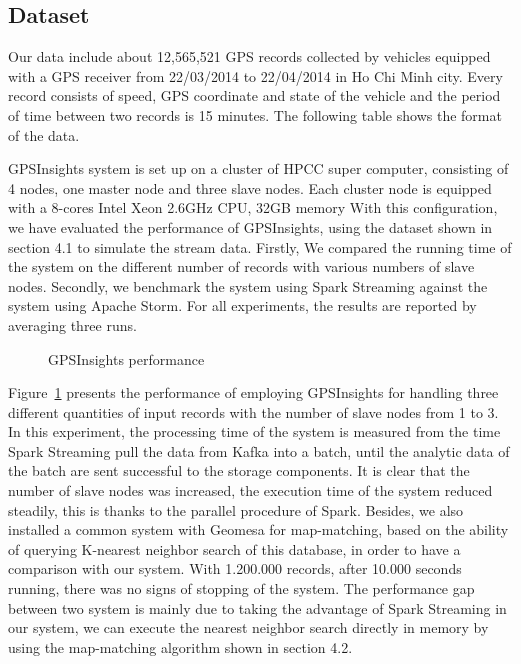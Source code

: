 \documentclass{acm_proc_article-sp}
\begin{document}
\subsection{Dataset}

Our data include about 12,565,521 GPS records collected by vehicles equipped with a GPS receiver from 22/03/2014 to 22/04/2014 in Ho Chi Minh city. Every record consists of speed, GPS coordinate and state of the vehicle and the period of time between two records is 15 minutes. The following table shows the format of the data.

	GPSInsights system is set up on a cluster of HPCC super computer, consisting of 4 nodes, one master node and three slave nodes. Each cluster node is equipped with a  8-cores Intel Xeon 2.6GHz CPU, 32GB memory 
	With this configuration, we have evaluated the performance of GPSInsights, using the dataset shown in section 4.1 to simulate the stream data. Firstly, We compared the running time of the system on the different number of records with various numbers of slave nodes. Secondly, we benchmark the system using Spark Streaming against the system using Apache Storm. For all experiments, the results are reported by averaging three runs. 
	
	
	\begin{figure}[h]
		\centering
		\caption{GPSInsights performance}
		\label{fig:performance}
	\end{figure}

Figure~\ref{fig:performance} presents the performance of employing GPSInsights for handling three different quantities of input records with the number of slave nodes from 1 to 3. In this experiment, the processing time of the system is measured from the time Spark Streaming pull the data from Kafka into a batch, until the analytic data of the batch are sent successful to the storage components. It is clear that the number of slave nodes was increased, the execution time of the system reduced steadily, this is thanks to the parallel procedure of Spark. Besides, we also installed a common system with Geomesa for map-matching, based on the ability of querying K-nearest neighbor search of this database, in order to have a comparison with our system. With 1.200.000 records, after 10.000 seconds running, there was no signs of stopping of the system. The performance gap between two system is mainly due to taking the advantage of Spark Streaming in our system,  we can execute the nearest neighbor search directly in memory by using the map-matching algorithm shown in section 4.2.
\end{document}
